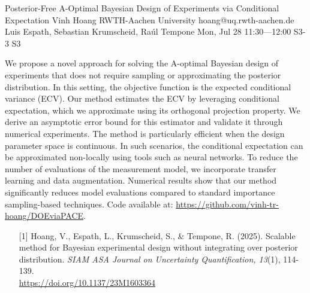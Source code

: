 \begin{talk}
  {Posterior-Free A-Optimal Bayesian Design of Experiments via Conditional Expectation}%
  {Vinh Hoang}%
  {RWTH-Aachen University}%
  {hoang@uq.rwth-aachen.de}%
  {Luis Espath, Sebastian Krumscheid, Ra\'ul Tempone}%
  {}%
  {Mon, Jul 28 11:30---12:00}%
  {S3-3}%
  {S3}%
  
    
   

\medskip

We propose a novel approach for solving the A-optimal Bayesian design of experiments that does not require sampling or approximating the posterior distribution. In this setting, the objective function is the expected conditional variance (ECV).
Our method estimates the ECV by leveraging conditional expectation, which we approximate using its orthogonal projection property. We derive an asymptotic error bound for this estimator and validate it through numerical experiments.
The method is particularly efficient when the design parameter space is continuous. In such scenarios, the conditional expectation can be approximated non-locally using tools such as neural networks. To reduce the number of evaluations of the measurement model, we incorporate transfer learning and data augmentation.
Numerical results show that our method significantly reduces model evaluations compared to standard importance sampling-based techniques.
Code available at: \href{https://github.com/vinh-tr-hoang/DOEviaPACE}{https://github.com/vinh-tr-hoang/DOEviaPACE}.

\begin{enumerate}
    \item [{[1]}] Hoang, V., Espath, L., Krumscheid, S., \& Tempone, R. (2025).  
    Scalable method for Bayesian experimental design without integrating over posterior distribution. {\it SIAM ASA Journal on Uncertainty Quantification, 13}(1), 114-139. \\
    \href{https://doi.org/10.1137/23M1603364}{https://doi.org/10.1137/23M1603364}
\end{enumerate}


\end{talk}

